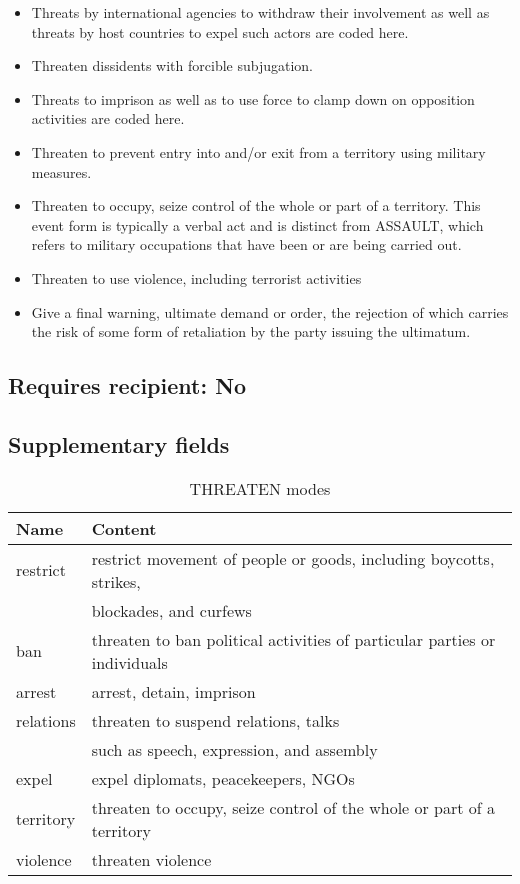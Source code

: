 \documentclass[11pt]{report}
\newcommand{\plcat}[1]{\textsf{#1}}
\begin{document}
\begin{itemize}
\item Threats by international agencies to withdraw their involvement as well as threats by host countries to expel such actors are coded here. 
\item Threaten dissidents with forcible subjugation.
\item Threats to imprison as well as to use force to clamp down on opposition activities are coded here. 
\item Threaten to prevent entry into and/or exit from a territory using military measures.
\item Threaten to occupy, seize control of the whole or part of a territory.  This event form is typically a verbal act and is distinct from \plcat{ASSAULT}, which refers to military occupations that have been or are being carried out.
\item Threaten to use violence, including terrorist activities

\item Give a final warning, ultimate demand or order, the rejection of which carries the risk of some form of retaliation by the party issuing the ultimatum. 
\end{itemize}

\subsection{Requires recipient: No}

\subsection{Supplementary fields}

\begin{table}[htp]
\caption{THREATEN modes}
\begin{center}
\begin{tabular}{|l|l|}
\hline
Name & Content \\
\hline
restrict & restrict movement of people or goods, including boycotts, strikes,  \\
& blockades, and curfews \\
ban & threaten to ban political activities of particular parties or individuals \\
arrest & arrest, detain, imprison \\
relations & threaten to suspend relations, talks \\
& such as speech, expression, and assembly\\
expel & expel diplomats, peacekeepers, NGOs \\
territory & threaten to occupy, seize control of the whole or part of a territory \\
violence & threaten violence \\
\hline
\end{tabular}
\end{center}
\label{tab:threatmode}
\end{table}%
\end{document}
